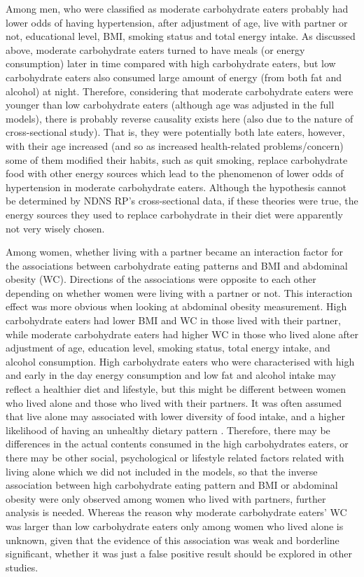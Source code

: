 Among men, who were classified as moderate carbohydrate eaters probably had lower odds of having hypertension, after adjustment of age, live with partner or not, educational level, BMI, smoking status and total energy intake. As discussed above, moderate carbohydrate eaters turned to have meals (or energy consumption) later in time compared with high carbohydrate eaters, but low carbohydrate eaters also consumed large amount of energy (from both fat and alcohol) at night. Therefore, considering that moderate carbohydrate eaters were younger than low carbohydrate eaters (although age was adjusted in the full models), there is probably reverse causality exists here (also due to the nature of cross-sectional study). That is, they were potentially both late eaters, however, with their age increased (and so as increased health-related problems/concern) some of them modified their habits, such as quit smoking, replace carbohydrate food with other energy sources which lead to the phenomenon of lower odds of hypertension in moderate carbohydrate eaters. Although the hypothesis cannot be determined by NDNS RP's cross-sectional data, if these theories were true, the energy sources they used to replace carbohydrate in their diet were apparently not very wisely chosen. 

Among women, whether living with a partner became an interaction factor for the associations between carbohydrate eating patterns and BMI and abdominal obesity (WC). Directions of the associations were opposite to each other depending on whether women were living with a partner or not. This interaction effect was more obvious when looking at abdominal obesity measurement. High carbohydrate eaters had lower BMI and WC in those lived with their partner, while moderate carbohydrate eaters had higher WC in those who lived alone after adjustment of age, education level, smoking status, total energy intake, and alcohol consumption. High carbohydrate eaters who were characterised with high and early in the day energy consumption and low fat and alcohol intake may reflect a healthier diet and lifestyle, but this might be different between women who lived alone and those who lived with their partners. It was often assumed that live alone may associated with lower diversity of food intake, and a higher likelihood of having an unhealthy dietary pattern \parencite{hanna2015relationship}. Therefore, there may be differences in the actual contents consumed in the high carbohydrates eaters, or there may be other social, psychological or lifestyle related factors related with living alone which we did not included in the models, so that the inverse association between high carbohydrate eating pattern and BMI or abdominal obesity were only observed among women who lived with partners, further analysis is needed. Whereas the reason why moderate carbohydrate eaters' WC was larger than low carbohydrate eaters only among women who lived alone is unknown, given that the evidence of this association was weak and borderline significant, whether it was just a false positive result should be explored in other studies.

